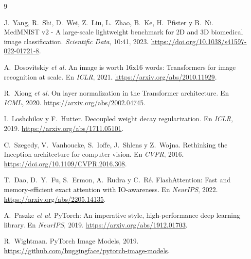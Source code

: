 \documentclass[11pt,a4paper]{article}
\begin{document}
\begin{thebibliography}{9}

J.~Yang, R.~Shi, D.~Wei, Z.~Liu, L.~Zhao, B.~Ke, H.~Pfister y B.~Ni.
\newblock MedMNIST v2 - A large-scale lightweight benchmark for 2D and 3D
  biomedical image classification.
\newblock \emph{Scientific Data}, 10:41, 2023.
\newblock \url{https://doi.org/10.1038/s41597-022-01721-8}.

A.~Dosovitskiy \emph{et al.}
\newblock An image is worth 16x16 words: Transformers for image recognition at
  scale.
\newblock En \emph{ICLR}, 2021.
\newblock \url{https://arxiv.org/abs/2010.11929}.

R.~Xiong \emph{et al.}
\newblock On layer normalization in the Transformer architecture.
\newblock En \emph{ICML}, 2020.
\newblock \url{https://arxiv.org/abs/2002.04745}.

I.~Loshchilov y F.~Hutter.
\newblock Decoupled weight decay regularization.
\newblock En \emph{ICLR}, 2019.
\newblock \url{https://arxiv.org/abs/1711.05101}.

C.~Szegedy, V.~Vanhoucke, S.~Ioffe, J.~Shlens y Z.~Wojna.
\newblock Rethinking the Inception architecture for computer vision.
\newblock En \emph{CVPR}, 2016.
\newblock \url{https://doi.org/10.1109/CVPR.2016.308}.

T.~Dao, D.~Y.~Fu, S.~Ermon, A.~Rudra y C.~Ré.
\newblock FlashAttention: Fast and memory-efficient exact attention with
  IO-awareness.
\newblock En \emph{NeurIPS}, 2022.
\newblock \url{https://arxiv.org/abs/2205.14135}.

A.~Paszke \emph{et al.}
\newblock PyTorch: An imperative style, high-performance deep learning library.
\newblock En \emph{NeurIPS}, 2019.
\newblock \url{https://arxiv.org/abs/1912.01703}.

R.~Wightman.
\newblock PyTorch Image Models, 2019.
\newblock \url{https://github.com/huggingface/pytorch-image-models}.

\end{thebibliography}
\end{document}
